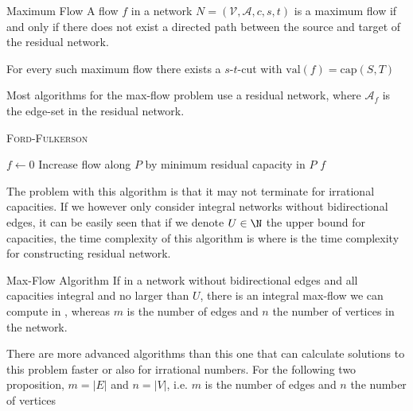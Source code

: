 \begin{theorem}[]{Maximum Flow}
    A flow $f$ in a network $N = (\mathcal{V}, \mathcal{A}, c, s, t)$ is a maximum flow if and only if there does not exist a directed path between the source and target of the residual network.

    For every such maximum flow there exists a $s$-$t$-cut with $\text{val}(f) = \text{cap}(S, T)$
\end{theorem}



\newpage
{}

Most algorithms for the max-flow problem use a residual network, where $\mathcal{A}_f$ is the edge-set in the residual network.

\begin{algorithm}
    \caption{\textsc{Ford-Fulkerson}}
    \begin{algorithmic}[1]
            \State $f \gets 0$ 
             
                \State Increase flow along $P$ by minimum residual capacity in $P$
            \EndWhile
            \State \Return $f$ 
        \EndProcedure
    \end{algorithmic}
\end{algorithm}

The problem with this algorithm is that it may not terminate for irrational capacities. If we however only consider integral networks without bidirectional edges, it can be easily seen that if we denote $U \in \N$ the upper bound for capacities, the time complexity of this algorithm is  where  is the time complexity for constructing residual network.
\begin{theorem}[]{Max-Flow Algorithm}
    If in a network without bidirectional edges and all capacities integral and no larger than $U$, there is an integral max-flow we can compute in , whereas $m$ is the number of edges and $n$ the number of vertices in the network.
\end{theorem}

There are more advanced algorithms than this one that can calculate solutions to this problem faster or also for irrational numbers.
For the following two proposition, $m = |E|$ and $n = |V|$, i.e. $m$ is the number of edges and $n$ the number of vertices


